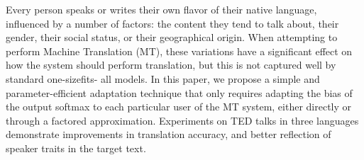 Every person speaks or writes their own flavor of their native language, influenced by a number of factors: the content they tend to talk about, their gender, their social status, or their geographical origin. When attempting to perform Machine Translation (MT), these variations have a significant effect on how the system should perform translation, but this is not captured well by standard one-sizefits- all models. In this paper, we propose a simple and parameter-efficient adaptation technique that only requires adapting the bias of the output softmax to each particular user of the MT system, either directly or through a factored approximation. Experiments on TED talks in three languages demonstrate improvements in translation accuracy, and better reflection of speaker traits in the target text.
